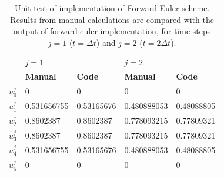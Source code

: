 \documentclass[12pt]{extarticle}
\begin{document}
\begin{table}[h]
	\centering
	\begin{tabular}{l|ll|ll|}
		\cline{2-5}
		& \multicolumn{2}{l|}{\textbf{$j=1$}}                 & \multicolumn{2}{l|}{\textbf{$j=2$}}                  \\ \cline{2-5} 
		& \multicolumn{1}{l|}{\textbf{Manual}} & \textbf{Code} & \multicolumn{1}{l|}{\textbf{Manual}} & \textbf{Code} \\ \hline
		\multicolumn{1}{|l|}{$u_0^j$} & \multicolumn{1}{l|}{0}               & 0             & \multicolumn{1}{l|}{0}               & 0             \\ \hline
		\multicolumn{1}{|l|}{$u_1^j$} & \multicolumn{1}{l|}{0.531656755}     & 0.53165676    & \multicolumn{1}{l|}{0.480888053}     & 0.48088805    \\ \hline
		\multicolumn{1}{|l|}{$u_2^j$} & \multicolumn{1}{l|}{0.8602387}       & 0.8602387     & \multicolumn{1}{l|}{0.778093215}     & 0.77809321    \\ \hline
		\multicolumn{1}{|l|}{$u_3^j$} & \multicolumn{1}{l|}{0.8602387}       & 0.8602387     & \multicolumn{1}{l|}{0.778093215}     & 0.77809321    \\ \hline
		\multicolumn{1}{|l|}{$u_4^j$} & \multicolumn{1}{l|}{0.531656755}     & 0.53165676    & \multicolumn{1}{l|}{0.480888053}     & 0.48088805    \\ \hline
		\multicolumn{1}{|l|}{$u_5^j$} & \multicolumn{1}{l|}{0}               & 0             & \multicolumn{1}{l|}{0}               & 0             \\ \hline
	\end{tabular}
	\caption{Unit test of implementation of Forward Euler scheme. Results from manual calculations are compared with the output of forward euler implementation, for time steps $j=1$ ($t = \Delta t$) and $j=2$ ($t = 2\Delta t$).}
	\label{tab:unit_test}
\end{table}




\end{document}

